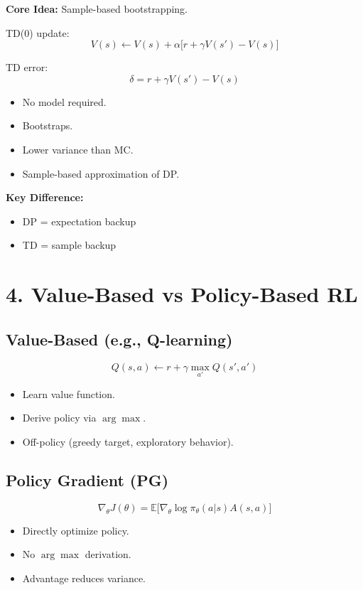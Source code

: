 \documentclass[11pt]{article}
\begin{document}
\textbf{Core Idea:} Sample-based bootstrapping.

TD(0) update:
\[
V(s) \leftarrow V(s) + \alpha \big[r + \gamma V(s') - V(s)\big]
\]

TD error:
\[
\delta = r + \gamma V(s') - V(s)
\]

\begin{itemize}
\item No model required.
\item Bootstraps.
\item Lower variance than MC.
\item Sample-based approximation of DP.
\end{itemize}

\textbf{Key Difference:}
\begin{itemize}
\item DP = expectation backup
\item TD = sample backup
\end{itemize}

\vspace{1em}

\section*{4. Value-Based vs Policy-Based RL}

\subsection*{Value-Based (e.g., Q-learning)}

\[
Q(s,a) \leftarrow r + \gamma \max_{a'} Q(s',a')
\]

\begin{itemize}
\item Learn value function.
\item Derive policy via $\arg\max$.
\item Off-policy (greedy target, exploratory behavior).
\end{itemize}

\subsection*{Policy Gradient (PG)}

\[
\nabla_\theta J(\theta) =
\mathbb{E}\big[\nabla_\theta \log \pi_\theta(a|s) A(s,a)\big]
\]

\begin{itemize}
\item Directly optimize policy.
\item No $\arg\max$ derivation.
\item Advantage reduces variance.
\end{itemize}
\end{document}
